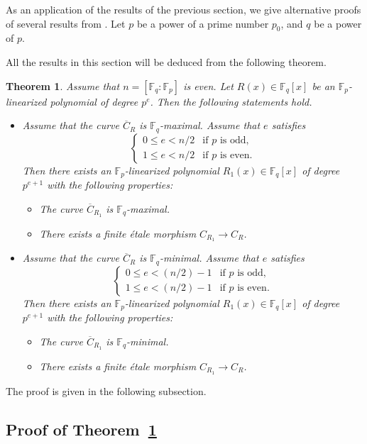 \documentclass[12pt,a4paper]{amsart}
\newtheorem{theorem}{Theorem}[section]
\theoremstyle{definition}
\def\F{{\mathbb F}}
\theoremstyle{remark}
\begin{document}
As an application of the results of the previous section, we give alternative proofs of several results from \cite{CO0}. 
Let $p$ be a power of a prime number $p_0$, and $q$ be a power of $p$. 

All the results in this section will be deduced from the following theorem. 

\begin{theorem}\label{exist12}
Assume that $n=[\F_q:\F_p]$ is even. 
Let $R(x) \in \F_q[x]$ 
be an $\F_p$-linearized polynomial of degree $p^e$. Then the following statements hold. 
\begin{itemize}
\item[{\rm (i)}] 
Assume that the curve $\overline{C}_R$ is $\F_q$-maximal. Assume that $e$ satisfies 
\[
\begin{cases}
0 \le e < n/2 & \textrm{if $p$ is odd}, \\
1 \le e < n/2 &\textrm{if $p$ is even}. 
\end{cases}
\]
Then there exists an $\F_p$-linearized polynomial $R_1(x) \in \F_q[x]$ of degree $p^{e+1}$ with the following properties: 
\begin{itemize}
    \item The curve $\overline{C}_{R_1}$ is $\F_q$-maximal. 
    \item There exists a finite \'etale morphism $C_{R_1}\to C_R$. 
\end{itemize}
\item[{\rm (ii)}] 
Assume that the curve $\overline{C}_R$ is $\F_q$-minimal. Assume that $e$ satisfies 
\[
\begin{cases}
0 \le e < (n/2)-1 & \textrm{if $p$ is odd}, \\
1 \le e < (n/2)-1 &\textrm{if $p$ is even}. 
\end{cases}
\]
Then there exists an $\F_p$-linearized polynomial $R_1(x)\in \F_q[x]$ of degree $p^{e+1}$ with the following properties: 
\begin{itemize}
    \item The curve $\overline{C}_{R_1}$ is $\F_q$-minimal. 
    \item There exists a finite \'etale morphism $C_{R_1}\to C_R$. 
\end{itemize}
\end{itemize}
\end{theorem}
The proof is given in the following subsection. 
\subsection{Proof of Theorem~\ref{exist12}}
\end{document}
